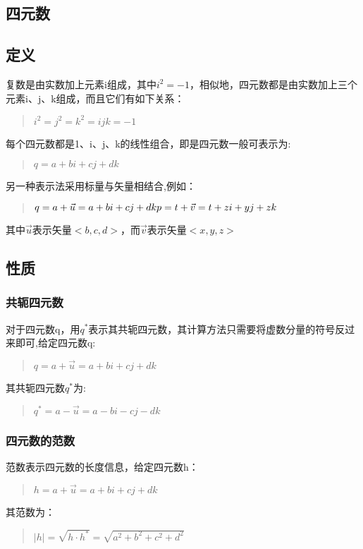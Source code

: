 \documentclass[a4paper,10pt]{article}
\begin{document}
\begin{CJK}{UTF8}{song}
\section{四元数}
\subsection{定义}
复数是由实数加上元素i组成，其中$i^{2}=-1$，相似地，四元数都是由实数加上三个元素i、j、k组成，而且它们有如下关系：
\begin{quote}
\begin{math}
i^{2}=j^{2}=k^{2}=ijk=-1 
\end{math}
\end{quote}
每个四元数都是1、i、j、k的线性组合，即是四元数一般可表示为:
\begin{quote}
$q=a+bi+cj+dk$
\end{quote}
另一种表示法采用标量与矢量相结合,例如：
\begin{quote}
\begin{math}
q=a+\vec{u}=a+bi+cj+dk \\
p=t+\vec{v}=t+zi+yj+zk
\end{math}
\end{quote}
其中$\vec{u}$表示矢量$<b,c,d>$，而$\vec{v}$表示矢量$<x,y,z>$

\subsection{性质}
\subsubsection{共轭四元数}
对于四元数q，用$q^{*}$表示其共轭四元数，其计算方法只需要将虚数分量的符号反过来即可,给定四元数q:
\begin{quote}
$ q=a+\vec{u}=a+bi+cj+dk$
\end{quote}
其共轭四元数$q^{*}$为:
\begin{quote}
$ q^{*}=a-\vec{u}=a-bi-cj-dk$
\end{quote}
\subsubsection{四元数的范数}
范数表示四元数的长度信息，给定四元数h：
\begin{quote}
$ h=a+\vec{u}=a+bi+cj+dk$
\end{quote}
其范数为：
\begin{quote}
$|h|=\sqrt{h\cdot h^{*}}=\sqrt{a^{2}+b^{2}+c^{2}+d^{2}}$
\end{quote}



\end{CJK}
\end{document}

